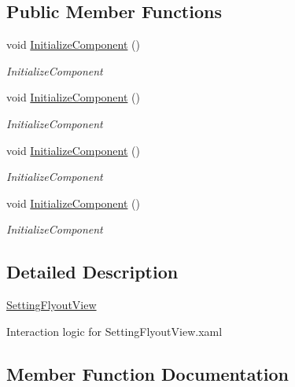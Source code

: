 \subsection*{Public Member Functions}
\begin{DoxyCompactItemize}
\item 
void \hyperlink{class_presentation_1_1_view_1_1_flyout_1_1_setting_flyout_view_abbcaa47b8f30638a2b4254afeb72dd33}{Initialize\+Component} ()
\begin{DoxyCompactList}\small\item\em Initialize\+Component \end{DoxyCompactList}\item 
void \hyperlink{class_presentation_1_1_view_1_1_flyout_1_1_setting_flyout_view_abbcaa47b8f30638a2b4254afeb72dd33}{Initialize\+Component} ()
\begin{DoxyCompactList}\small\item\em Initialize\+Component \end{DoxyCompactList}\item 
void \hyperlink{class_presentation_1_1_view_1_1_flyout_1_1_setting_flyout_view_abbcaa47b8f30638a2b4254afeb72dd33}{Initialize\+Component} ()
\begin{DoxyCompactList}\small\item\em Initialize\+Component \end{DoxyCompactList}\item 
void \hyperlink{class_presentation_1_1_view_1_1_flyout_1_1_setting_flyout_view_abbcaa47b8f30638a2b4254afeb72dd33}{Initialize\+Component} ()
\begin{DoxyCompactList}\small\item\em Initialize\+Component \end{DoxyCompactList}\end{DoxyCompactItemize}


\subsection{Detailed Description}
\hyperlink{class_presentation_1_1_view_1_1_flyout_1_1_setting_flyout_view}{Setting\+Flyout\+View} 

Interaction logic for Setting\+Flyout\+View.\+xaml 

\subsection{Member Function Documentation}
\mbox{\label{class_presentation_1_1_view_1_1_flyout_1_1_setting_flyout_view_abbcaa47b8f30638a2b4254afeb72dd33}} 
